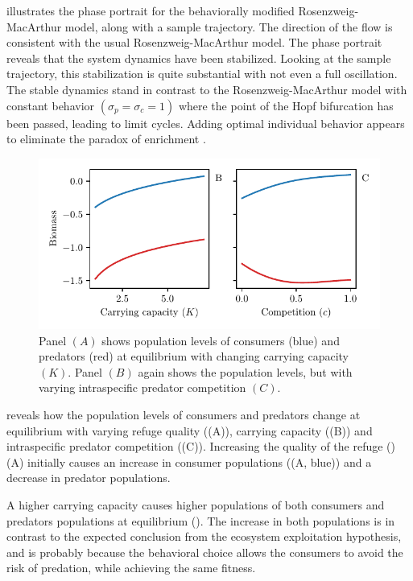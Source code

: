  illustrates the phase portrait for the behaviorally modified Rosenzweig-MacArthur model, along with a sample trajectory. The direction of the flow is consistent with the usual Rosenzweig-MacArthur model. The phase portrait reveals that the system dynamics have been stabilized. Looking at the sample trajectory, this stabilization is quite substantial with not even a full oscillation. The stable dynamics stand in contrast to the Rosenzweig-MacArthur model with constant behavior $(\sigma_p=\sigma_c=1)$ where the point of the Hopf bifurcation has been passed, leading to limit cycles. Adding optimal individual behavior appears to eliminate the paradox of enrichment \citep{rosenzweig1971paradox}.
\begin{figure}[H]
  \caption{Panel $(A)$ shows population levels of consumers (blue) and predators (red) at equilibrium with changing carrying capacity $(K)$. Panel $(B)$ again shows the population levels, but with varying intraspecific predator competition $(C)$.}
  \label{fig:pop_levels}
  \includegraphics{plots/pop_levels_c.pdf}
\end{figure}
 reveals how the population levels of consumers and predators change at equilibrium with varying refuge quality ((A)), carrying capacity ((B)) and intraspecific predator competition ((C)).
Increasing the quality of the refuge ()(A) initially causes an increase in consumer populations ((A, blue)) and a decrease in predator populations.

A higher carrying capacity causes higher populations of both consumers and predators populations at equilibrium (). The increase in both populations is in contrast to the expected conclusion from the ecosystem exploitation hypothesis, and is probably because the behavioral choice allows the consumers to avoid the risk of predation, while achieving the same fitness.

